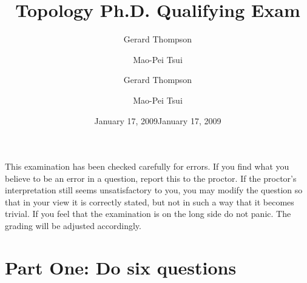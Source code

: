 \documentclass[12pt]{exam}
\author{Gerard Thompson \and Mao-Pei Tsui }
\date{January 17, 2009}
\theoremstyle{definition}
\begin{document}
\title{Topology Ph.D. Qualifying Exam}
\author{Gerard Thompson \and Mao-Pei Tsui }
\date{January 17, 2009}
\maketitle \noindent This examination  has been checked carefully
for errors. If you find what you believe to be an error in a
question, report this to the proctor. If the proctor's
interpretation still seems unsatisfactory to you,  you may modify
the question so that in your view it is correctly stated, but not in
such a way that it becomes trivial. If you feel that the examination
is on the long side do not panic. The grading will be adjusted
accordingly.

\setcounter{page}{1}

\section{Part One: Do six questions}
\end{document}
